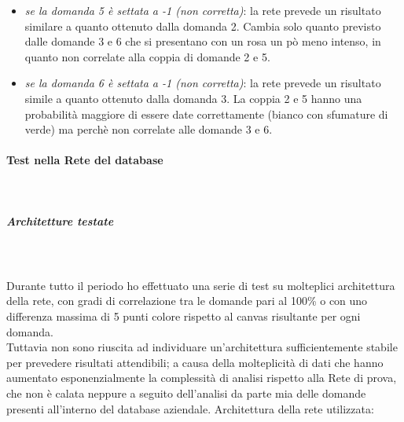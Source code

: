 \begin{itemize}
\begin{itemize}
\item \textit{se la domanda 5 \`e settata a -1 (non corretta)}: la rete prevede un risultato similare a quanto ottenuto dalla domanda 2. Cambia solo quanto previsto dalle domande 3 e 6 che si presentano con un rosa un p\`o meno intenso, in quanto non  correlate alla coppia di domande 2 e 5.
\item \textit{se la domanda 6 \`e settata a -1 (non corretta)}: la rete prevede un risultato simile a quanto ottenuto dalla domanda 3. La coppia 2 e 5 hanno una probabilit\`a maggiore di essere date correttamente (bianco con sfumature di verde) ma perch\`e non correlate alle domande 3 e 6.
\end{itemize}
\end{itemize}

\paragraph{Test nella Rete del database}\mbox{}\\
\label{Test nella Rete del database}
\noindent
\subparagraph{Architetture testate}\mbox{}\\\\
\label{Architetture testate}
\noindent
Durante tutto il periodo ho effettuato una serie di test su molteplici architettura della rete, con gradi di correlazione tra le domande pari al 100\% o con uno differenza massima di 5 punti colore rispetto al canvas risultante per ogni domanda.\\
Tuttavia non sono riuscita ad individuare un'architettura sufficientemente stabile per prevedere risultati attendibili; a causa della molteplicit\`a di dati che hanno aumentato esponenzialmente  la complessit\`a di analisi rispetto alla Rete di prova, che non \`e calata neppure a seguito dell'analisi da parte mia delle domande presenti all'interno del database aziendale.
Architettura della rete utilizzata:
